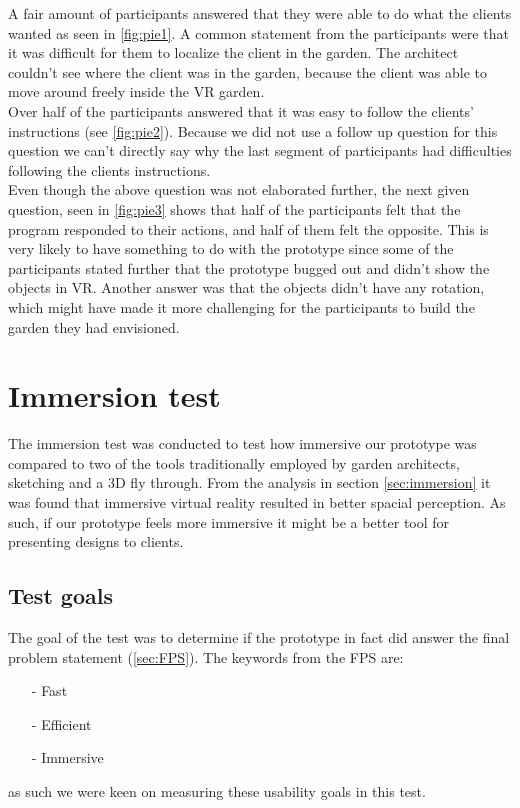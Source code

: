 A fair amount of participants answered that they were able to do what the clients wanted as seen in \ref{fig:pie1}. A common statement from the participants were that it was difficult for them to localize the client in the garden. The architect couldn't see where the client was in the garden, because the client was able to move around freely inside the VR garden.\\


Over half of the participants answered that it was easy to follow the clients' instructions (see \autoref{fig:pie2}). Because we did not use a follow up question for this question we can't directly say why the last segment of participants had difficulties following the clients instructions.\\

Even though the above question was not elaborated further, the next given question, seen in \ref{fig:pie3} shows that half of the participants felt that the program responded to their actions, and half of them felt the opposite. This is very likely to have something to do with the prototype since some of the participants stated further that the prototype bugged out and didn't show the objects in VR. Another answer was that the objects didn't have any rotation, which might have made it more challenging for the participants to build the garden they had envisioned.



\section{Immersion test}
The immersion test was conducted to test how immersive our prototype was compared to two of the tools traditionally employed by garden architects, sketching and a 3D fly through. From the analysis in section \ref{sec:immersion} it was found that immersive virtual reality resulted in better spacial perception. As such, if our prototype feels more immersive it might be a better tool for presenting designs to clients.

\subsection{Test goals}
The goal of the test was to determine if the prototype in fact did answer the final problem statement (\autoref{sec:FPS}). The keywords from the FPS are:
\begin{itemize}
	\item[-] Fast
	\item[-] Efficient
	\item[-] Immersive
\end{itemize}
as such we were keen on measuring these usability goals in this test.
